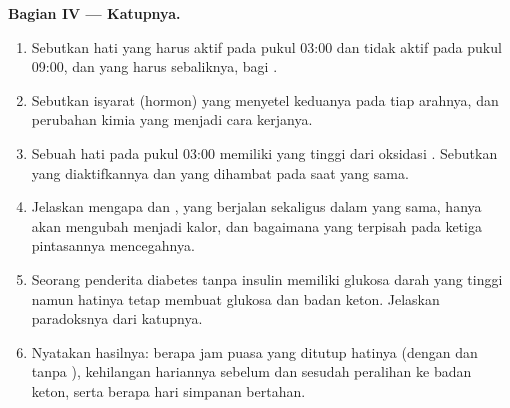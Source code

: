 \begin{problem}
\medskip
\noindent\textbf{Bagian IV --- Katupnya.}
\begin{enumerate}[resume]
  \item Sebutkan  hati yang harus aktif pada pukul 03:00 dan tidak
        aktif pada pukul 09:00, dan  yang harus sebaliknya, bagi
        .
  \item Sebutkan isyarat (hormon) yang menyetel keduanya pada tiap
        arahnya, dan perubahan kimia yang menjadi cara kerjanya.
  \item Sebuah  hati pada pukul 03:00 memiliki  yang
        tinggi dari oksidasi . Sebutkan  
        yang diaktifkannya dan   yang dihambat  pada
        saat yang sama.
  \item Jelaskan mengapa  dan , yang berjalan
        sekaligus dalam  yang sama, hanya akan mengubah  menjadi
        kalor, dan bagaimana  yang terpisah pada ketiga pintasannya
        mencegahnya.
  \item Seorang penderita diabetes tanpa insulin memiliki glukosa darah
        yang tinggi namun hatinya tetap membuat glukosa dan badan keton.
        Jelaskan paradoksnya dari katupnya.
  \item Nyatakan hasilnya: berapa jam puasa yang ditutup 
        hatinya (dengan dan tanpa ), kehilangan 
        hariannya sebelum dan sesudah peralihan ke badan keton, serta
        berapa hari simpanan  bertahan.
\end{enumerate}
\end{problem}
